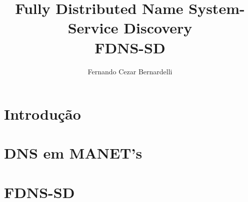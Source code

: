 \documentclass[12pt,a4paper]{style/ufpr}
\title{Fully Distributed Name System-Service Discovery\\FDNS-SD}
\author{Fernando Cezar Bernardelli}
\date{}
\begin{document}
\renewcommand{\thesection}{\arabic{section}} 
\makecapaproposta

\tableofcontents

\begin{abstract}
\end{abstract}

\section{Introdução}


\section{DNS em MANET's}


\section{FDNS-SD}


\newpage


\end{document}
